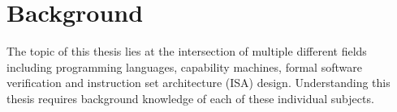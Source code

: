 \chapter{Background}
\label{cha:litrev}
The topic of this thesis lies at the intersection of multiple different fields including programming languages, capability machines, formal software verification and instruction set architecture (ISA) design. Understanding this thesis requires background knowledge of each of these individual subjects.



%
%

